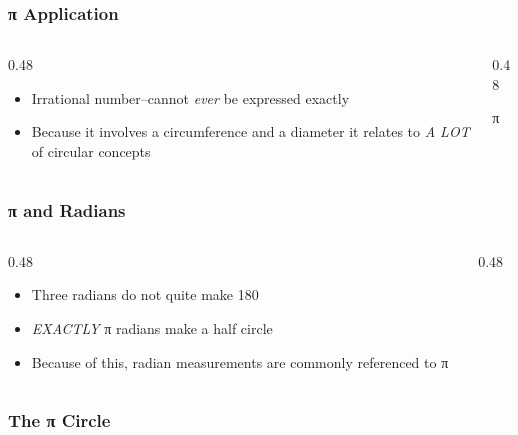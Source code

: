 \begin{frame}
	\frametitle{π Application}

    \begin{columns}
        \begin{column}{0.48\linewidth}
            \begin{itemize}[<+- | alert@+>]
                \item Irrational number--cannot \emph{ever} be expressed exactly 
                \item Because it involves a circumference and a diameter it relates to \emph{A LOT} of circular concepts
            \end{itemize}
        \end{column}
        \begin{column}{0.48\linewidth}
            \centering
            {\Huge π\par}
        \end{column}
    \end{columns}
\end{frame}

\begin{frame}
	\frametitle{π and Radians}

    \begin{columns}
        \begin{column}{0.48\linewidth}
            \begin{itemize}[<+- | alert@+>]
                \item Three radians do not quite make 180\textdegree{}
                \item \emph{EXACTLY} π radians make a half circle
                \item Because of this, radian measurements are commonly referenced to π
            \end{itemize}
        \end{column}
        \begin{column}{0.48\linewidth}
            \centering
            \resizebox{\linewidth}{!}{
                
            }
        \end{column}
    \end{columns}
\end{frame}

\begin{frame}
	\frametitle{The π Circle}

    \begin{figure}
        \centering
        \resizebox{0.5\linewidth}{!}{
            
        }
    \end{figure}
\end{frame}


